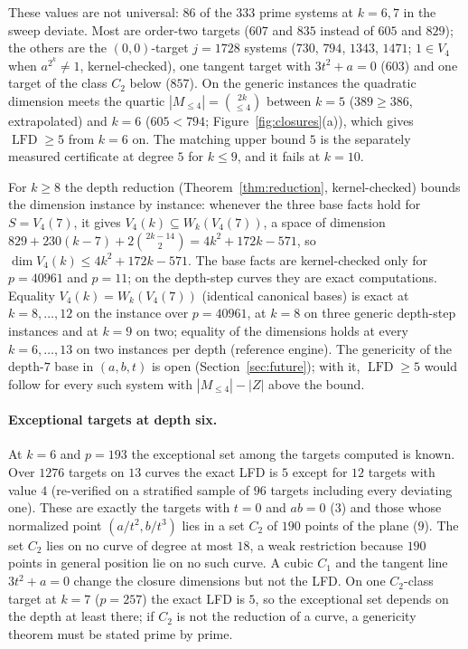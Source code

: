\documentclass[11pt]{article}
\theoremstyle{definition}\newtheorem{definition}[theorem]{Definition}
\theoremstyle{remark}\newtheorem{remark}[theorem]{Remark}
\newcommand{\lfd}{\operatorname{LFD}}
\begin{document}
These values are not universal: $86$ of the $333$ prime systems at $k=6,7$
in the sweep deviate. Most are order-two targets ($607$ and $835$ instead of
$605$ and $829$); the others are the $(0,0)$-target $j=1728$ systems
($730$, $794$, $1343$, $1471$; $1\in V_4$ when $a^{2^k}\ne1$,
kernel-checked), one tangent target with $3t^2+a=0$ ($603$) and one target
of the class $C_2$ below ($857$). On the generic instances the quadratic
dimension meets the quartic $|M_{\le4}|=\binom{2k}{\le4}$ between $k=5$
($389\ge386$, extrapolated) and $k=6$ ($605<794$;
Figure~\ref{fig:closures}(a)), which gives $\lfd\ge5$ from $k=6$ on. The
matching upper bound $5$ is the separately measured certificate at degree
$5$ for $k\le9$, and it fails at $k=10$.

For $k\ge8$ the depth reduction (Theorem~\ref{thm:reduction},
kernel-checked) bounds the dimension instance by instance: whenever the
three base facts hold for $S=V_4(7)$, it gives
$V_4(k)\subseteq W_k(V_4(7))$, a space of dimension
$829+230(k-7)+2\binom{2k-14}{2}=4k^2+172k-571$, so
$\dim V_4(k)\le4k^2+172k-571$. The base facts are kernel-checked only for
$p=40961$ and $p=11$; on the depth-step curves they are exact computations.
Equality $V_4(k)=W_k(V_4(7))$ (identical canonical bases) is exact at
$k=8,\ldots,12$ on the instance over $p=40961$, at $k=8$ on three generic
depth-step instances and at $k=9$ on two; equality of the dimensions holds at
every $k=6,\ldots,13$ on two instances per depth (reference engine). The
genericity of the depth-$7$ base in $(a,b,t)$ is open
(Section~\ref{sec:future}); with it, $\lfd\ge5$ would follow for every such
system with $|M_{\le4}|-|Z|$ above the bound.

\paragraph{Exceptional targets at depth six.} At $k=6$ and $p=193$ the
exceptional set among the targets computed is known. Over $1276$ targets on
$13$ curves the exact LFD is $5$ except for $12$ targets with value $4$
(re-verified on a stratified sample of $96$ targets including every
deviating one). These are exactly the targets with $t=0$ and $ab=0$ ($3$)
and those whose normalized point $(a/t^2,b/t^3)$ lies in a set $C_2$ of
$190$ points of the plane ($9$). The set $C_2$ lies on no curve of degree at
most $18$, a weak restriction because $190$ points in general position lie
on no such curve. A cubic $C_1$ and the tangent line $3t^2+a=0$ change the
closure dimensions but not the LFD. On one $C_2$-class target at $k=7$
($p=257$) the exact LFD is $5$, so the exceptional set depends on the depth
at least there; if $C_2$ is not the reduction of a curve, a genericity
theorem must be stated prime by prime.
\end{document}
